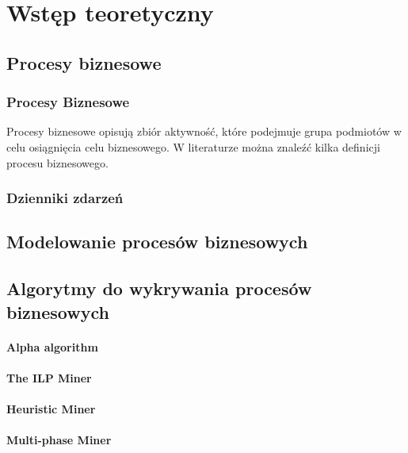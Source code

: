 \chapter{Wstęp teoretyczny}
\label{cha:wstepTeoretyczny}


\section{Procesy biznesowe}
\label{sec:procesyBiznesowe}
\subsection{Procesy Biznesowe}
Procesy biznesowe opisują zbiór aktywność, które podejmuje grupa podmiotów w celu osiągnięcia celu biznesowego. W literaturze można znaleźć kilka definicji procesu biznesowego. 
\subsection{Dzienniki zdarzeń}


\section{Modelowanie procesów biznesowych}
\label{sec:modelowanie}


\section{Algorytmy do wykrywania procesów biznesowych}
\label{sec:algorytmy}
\subsubsection{Alpha algorithm}
\subsubsection{The ILP Miner}
\subsubsection{Heuristic Miner}
\subsubsection{Multi-phase Miner}

